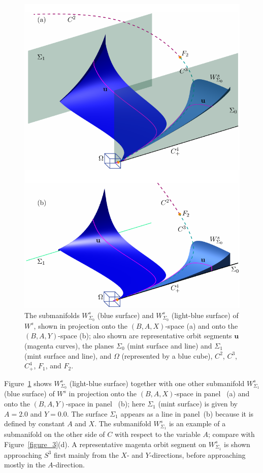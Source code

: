 \documentclass{ws-ijbc}
\begin{document}
\begin{figure}[t!]
\centering
\includegraphics[]{./figures/MKMO_5.pdf}
\caption{The submanifolds $W^{s}_{\Sigma_0}$ (blue surface) and $W^{s}_{\Sigma_0}$ (light-blue surface) of $W^s$, shown in projection onto the $(B,A,X)$-space (a) and onto the $(B,A,Y)$-space (b); also shown are representative orbit segments $\mathbf{u}$ (magenta curves), the planes $\Sigma_0$ (mint surface and line) and $\Sigma_1$ (mint surface and line), and $\Omega$ (represented by a blue cube), $C^2$, $C^3$, $C^4_+$, $F_1$, and $F_2$.}
\label{figure_5}
\end{figure}

Figure~\ref{figure_5} shows $W^s_{\Sigma_0}$ (light-blue surface) together with one other submanifold $W^{s}_{\Sigma_1}$ (blue surface) of $W^{s}$ in projection onto the $(B,A,X)$-space in panel~ (a) and onto the $(B,A,Y)$-space in panel~ (b); here $\Sigma_1$ (mint surface) is given by $A=2.0$ and $Y=0.0$.  The surface $\Sigma_1$ appears as a line in panel~(b) because it is defined by constant $A$ and $X$.  The submanifold $W^s_{\Sigma_1}$ is an example of a submanifold on the other side of $C$ with respect to the variable $A$; compare with Figure~\ref{figure_3}(d).  A representative magenta orbit segment on $W^s_{\Sigma_1}$ is shown approaching $S^3$ first mainly from the $X$- and $Y$-directions, before approaching mostly in the $A$-direction.
\end{document}
